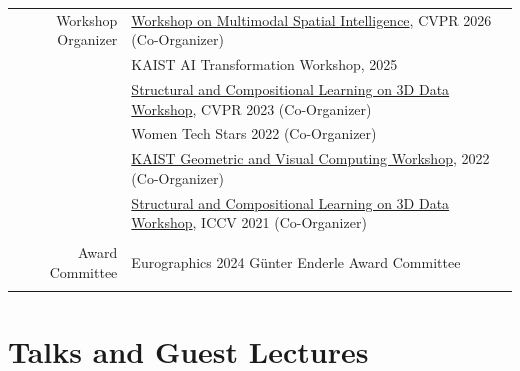 \documentclass[letterpaper,10pt]{article} %
\newcommand{\blankline}{\quad\pagebreak[2]}
\begin{document}
\begin{longtable}{r|p{11cm}}
Workshop Organizer & \href{https://musi-workshop.github.io/}{Workshop on Multimodal Spatial Intelligence}, CVPR 2026 (Co-Organizer)\\
& KAIST AI Transformation Workshop, 2025\\
& \href{https://struco3d.github.io/cvpr2023/}{Structural and Compositional Learning on 3D Data Workshop}, CVPR 2023 (Co-Organizer)\\
& Women Tech Stars 2022 (Co-Organizer)\\
& \href{https://mhsung.github.io/gvc-workshop-2022/}{KAIST Geometric and Visual Computing Workshop}, 2022 (Co-Organizer)\\
& \href{https://struco3d.github.io/iccv2021/}{Structural and Compositional Learning on 3D Data Workshop}, ICCV 2021 (Co-Organizer)\\
& \\
Award Committee & Eurographics 2024 G\"unter Enderle Award Committee\\
& \\
\end{longtable}


\blankline




\section{Talks and Guest Lectures}
\end{document}
